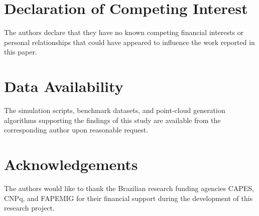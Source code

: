 \documentclass[preprint,12pt]{elsarticle}
\begin{document}
\section*{Declaration of Competing Interest}
The authors declare that they have no known competing financial interests or personal relationships that could have appeared to influence the work reported in this paper.

\section*{Data Availability}
The simulation scripts, benchmark datasets, and point-cloud generation algorithms supporting the findings of this study are available from the corresponding author upon reasonable request.

\section*{Acknowledgements}
The authors would like to thank the Brazilian research funding agencies CAPES, CNPq, and FAPEMIG for their financial support during the development of this research project.



\end{document}
